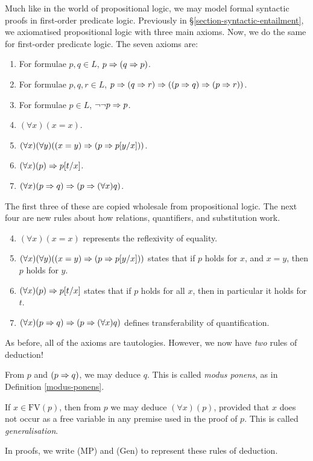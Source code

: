 \documentclass{article}
\begin{document}
Much like in the world of propositional logic, we may model formal syntactic proofs in first-order predicate logic. Previously in \S\ref{section-syntactic-entailment}, we axiomatised propositional logic with three main axioms. Now, we do the same for first-order predicate logic. The seven axioms are:
\begin{enumerate}
    \item For formulae $p, q \in L$, $p \Rightarrow (q \Rightarrow p)$.
    \item For formulae $p, q, r \in L$, $p \Rightarrow (q \Rightarrow r) \Rightarrow ((p \Rightarrow q) \Rightarrow (p \Rightarrow r))$.
    \item For formulae $p \in L$, $\lnot \lnot p \Rightarrow p$.
    \item $(\forall x)(x = x)$.
    \item $(\forall x)(\forall y)((x = y) \Rightarrow (p \Rightarrow p[y/x]))$.
    \item $(\forall x)(p) \Rightarrow p[t/x]$.
    \item $(\forall x)(p \Rightarrow q) \Rightarrow (p \Rightarrow (\forall x) q)$.
\end{enumerate}
The first three of these are copied wholesale from propositional logic. The next four are new rules about how relations, quantifiers, and substitution work.
\begin{enumerate}
	\setcounter{enumi}{3}
    \item $(\forall x)(x = x)$ represents the reflexivity of equality.
    \item $(\forall x)(\forall y)((x = y) \Rightarrow (p \Rightarrow p[y/x]))$ states that if $p$ holds for $x$, and $x = y$, then $p$ holds for $y$.
    \item $(\forall x)(p) \Rightarrow p[t/x]$ states that if $p$ holds for all $x$, then in particular it holds for $t$.
    \item $(\forall x)(p \Rightarrow q) \Rightarrow (p \Rightarrow (\forall x) q)$ defines transferability of quantification.
\end{enumerate}
As before, all of the axioms are tautologies. However, we now have \textit{two} rules of deduction!

\begin{definition}
	\label{deduction-rules}
    From $p$ and $(p \Rightarrow q)$, we may deduce $q$. This is called \textit{modus ponens}, as in Definition \ref{modus-ponens}.
    
    If $x \in \mathrm{FV}(p)$, then from $p$ we may deduce $(\forall x)(p)$, provided that $x$ does not occur as a free variable in any premise used in the proof of $p$. This is called \textit{generalisation}.
    
    In proofs, we write (MP) and (Gen) to represent these rules of deduction.
\end{definition}
\end{document}
